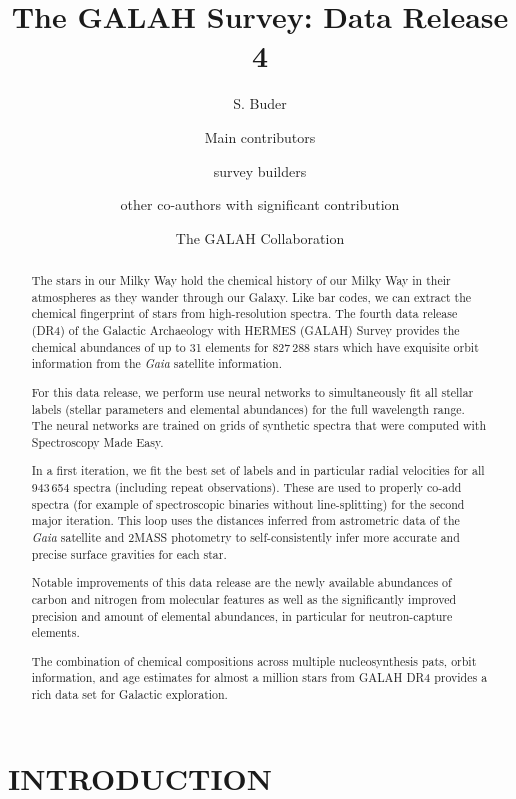 \documentclass[
  journal=pasa,
  manuscript=research-paper, %
  year=2021,
  volume=37
]{cup-journal}
\title{The GALAH Survey: Data Release 4}
\author{S. Buder}
\affiliation{Research School of Astronomy \& Astrophysics, Australian National University, Canberra, ACT 2611, Australia}
\affiliation{ARC Centre of Excellence for All Sky Astrophysics in 3 Dimensions (ASTRO 3D), Australia}
\author{Main contributors}
\author{survey builders}
\author{other co-authors with significant contribution}
\author{The GALAH Collaboration}
\newcommand{\Gaia}{\textit{Gaia}\xspace}
\begin{document}
\begin{abstract}

The stars in our Milky Way hold the chemical history of our Milky Way in their atmospheres as they wander through our Galaxy. Like bar codes, we can extract the chemical fingerprint of stars from high-resolution spectra. The fourth data release (DR4) of the Galactic Archaeology with HERMES (GALAH) Survey provides the chemical abundances of up to 31 elements for 827\,288 stars which have exquisite orbit information from the \Gaia satellite information.

For this data release, we perform use neural networks to simultaneously fit all stellar labels (stellar parameters and elemental abundances) for the full wavelength range. The neural networks are trained on grids of synthetic spectra that were computed with Spectroscopy Made Easy.

In a first iteration, we fit the best set of labels and in particular radial velocities for all 943\,654 spectra (including repeat observations). These are used to properly co-add spectra (for example of spectroscopic binaries without line-splitting) for the second major iteration. This loop uses the distances inferred from astrometric data of the \Gaia satellite and 2MASS photometry to self-consistently infer more accurate and precise surface gravities for each star.

Notable improvements of this data release are the newly available abundances of carbon and nitrogen from molecular features as well as the significantly improved precision and amount of elemental abundances, in particular for neutron-capture elements.

The combination of chemical compositions across multiple nucleosynthesis pats, orbit information, and age estimates for almost a million stars from GALAH DR4 provides a rich data set for Galactic exploration.

\end{abstract}

\section{INTRODUCTION}
\label{sec:introduction}
\end{document}
